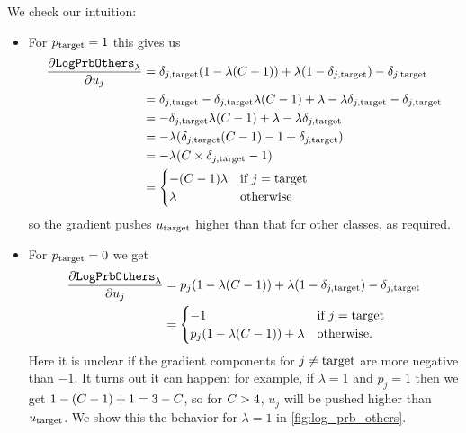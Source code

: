 \documentclass[../main.tex]{subfiles}
\begin{document}
We check our intuition:
\begin{itemize}
    \item For $p_{\mathrm{target}} = 1$ this gives us
          \begin{align*}
              \frac{\partial \mathtt{LogPrbOthers}_{\lambda}}{\partial u_j}
               & = \delta_{j, \mathrm{target}} (1 - \lambda (C - 1)) + \lambda (1 - \delta_{j, \mathrm{target}}) - \delta_{j, \mathrm{target}}      \\
               & = \delta_{j, \mathrm{target}} - \delta_{j, \mathrm{target}} \lambda (C - 1) + \lambda - \lambda \delta_{j, \mathrm{target}} - \delta_{j, \mathrm{target}} \\
               & = - \delta_{j, \mathrm{target}} \lambda (C - 1) + \lambda - \lambda \delta_{j, \mathrm{target}}             \\
               & = - \lambda (\delta_{j, \mathrm{target}} (C - 1) - 1 + \delta_{j, \mathrm{target}})                         \\
               & = - \lambda (C \times \delta_{j, \mathrm{target}} - 1)                                      \\
               & = \begin{cases}
                       - (C - 1) \lambda & \text{if } j = \mathrm{target} \\
                       \lambda                    & \text{otherwise}
                   \end{cases}
          \end{align*}
          so the gradient pushes $u_{\mathrm{target}}$ higher than that for other classes, as required.

    \item For $p_{\mathrm{target}} = 0$ we get
          \begin{align*}
              \frac{\partial \mathtt{LogPrbOthers}_{\lambda}}{\partial u_j}
               & = p_j (1 - \lambda (C - 1)) + \lambda (1 - \delta_{j, \mathrm{target}}) - \delta_{j, \mathrm{target}}        \\
               & = \begin{cases}
                       -1                                           & \text{if } j = \mathrm{target} \\
                       p_j(1 - \lambda ( C -1 )) + \lambda & \text{otherwise.}
                   \end{cases}
          \end{align*}
Here it is unclear if the gradient components for $j \neq \mathrm{target}$ are more negative than $-1$.
It turns out it can happen: for example, if $\lambda = 1$ and $p_j = 1$ then we get $1 - (C -1) + 1 = 3 - C$, so for $C > 4$, $u_j$ will be pushed higher than $u_{\mathrm{target}}$.
We show this the behavior for $\lambda = 1$ in \autoref{fig:log_prb_others}.
\end{itemize}
\end{document}

